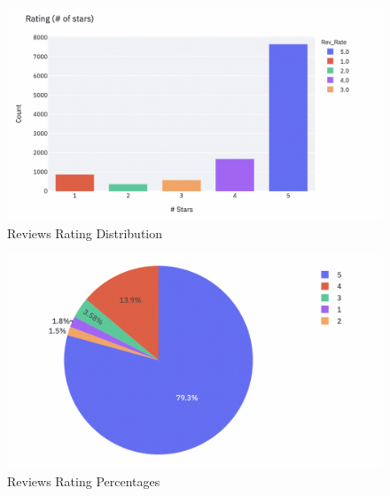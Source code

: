 \documentclass{article}
\begin{document}
\begin{figure}[H]
    \centering
    \includegraphics[scale=0.55]{src/img/rev_rate.png}
    \caption{Reviews Rating Distribution}
    \label{fig:my_label}
\end{figure}

\begin{figure}[H]
    \centering
    \includegraphics[scale=0.55]{src/img/rev_rate_pie.png}
    \caption{Reviews Rating Percentages}
    \label{fig:my_label}
\end{figure}
\end{document}
